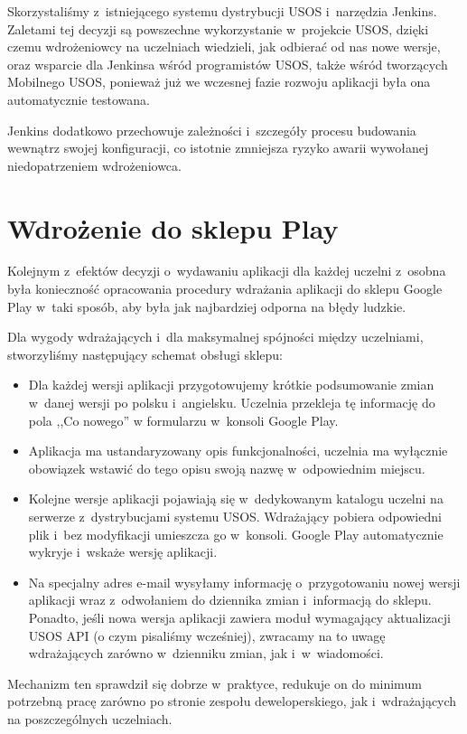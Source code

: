 \documentclass{pracamgr}
\begin{document}
Skorzystaliśmy z~istniejącego systemu dystrybucji USOS i~narzędzia Jenkins. Zaletami tej decyzji są powszechne
wykorzystanie w~projekcie USOS, dzięki czemu wdrożeniowcy na uczelniach wiedzieli, jak odbierać od nas nowe wersje,
oraz wsparcie dla Jenkinsa wśród programistów USOS, także wśród tworzących Mobilnego USOS, ponieważ już we wczesnej
fazie rozwoju aplikacji była ona automatycznie testowana.

Jenkins dodatkowo przechowuje zależności i~szczegóły procesu budowania wewnątrz swojej konfiguracji, co istotnie
zmniejsza ryzyko awarii wywołanej niedopatrzeniem wdrożeniowca.

\section{Wdrożenie do sklepu Play}

Kolejnym z~efektów decyzji o~wydawaniu aplikacji dla każdej uczelni z~osobna była
konieczność opracowania procedury wdrażania aplikacji do sklepu Google Play w~taki
sposób, aby była jak najbardziej odporna na błędy ludzkie.

Dla wygody wdrażających i~dla maksymalnej spójności między uczelniami, stworzyliśmy
następujący schemat obsługi sklepu:
\begin{itemize}
	\item Dla każdej wersji aplikacji przygotowujemy krótkie podsumowanie zmian
	w~danej wersji po polsku i~angielsku.
	Uczelnia przekleja tę informację do pola ,,Co nowego'' w formularzu w~konsoli Google Play.
	\item Aplikacja ma ustandaryzowany opis funkcjonalności, uczelnia ma wyłącznie
	obowiązek wstawić do tego opisu swoją nazwę w~odpowiednim miejscu.
	\item Kolejne wersje aplikacji pojawiają się w~dedykowanym katalogu uczelni na
	serwerze z~dystrybucjami systemu USOS. Wdrażający pobiera odpowiedni plik i~bez
	modyfikacji umieszcza go w~konsoli. Google Play automatycznie wykryje i~wskaże
	wersję aplikacji.
	\item Na specjalny adres e-mail wysyłamy informację o~przygotowaniu nowej wersji
	aplikacji wraz z~odwołaniem do dziennika zmian i~informacją do sklepu. Ponadto,
	jeśli nowa wersja aplikacji zawiera moduł wymagający aktualizacji USOS API
	(o czym pisaliśmy wcześniej), zwracamy na to uwagę wdrażających zarówno w~dzienniku
	zmian, jak i~w~wiadomości.
\end{itemize}

Mechanizm ten sprawdził się dobrze w~praktyce, redukuje on do minimum potrzebną pracę
zarówno po stronie zespołu deweloperskiego, jak i~wdrażających na poszczególnych uczelniach.
\end{document}
